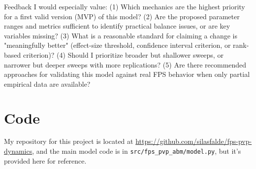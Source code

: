 \documentclass{assignment}
\begin{document}
Feedback I would especially value: (1) Which mechanics are the highest priority for a first valid version (MVP) of this model? (2) Are the proposed parameter ranges and metrics sufficient to identify practical balance issues, or are key variables missing? (3) What is a reasonable standard for claiming a change is "meaningfully better" (effect-size threshold, confidence interval criterion, or rank-based criterion)? (4) Should I prioritize broader but shallower sweeps, or narrower but deeper sweeps with more replications? (5) Are there recommended approaches for validating this model against real FPS behavior when only partial empirical data are available?

\section{Code}

My repository for this project is located at \url{https://github.com/silasfalde/fps-pvp-dynamics}, and the main model code is in \texttt{src/fps\_pvp\_abm/model.py}, but it's provided here for reference.

\lstset{
    language=Python,
    basicstyle=\ttfamily\small,
    breaklines=true,
    frame=single,
    numbers=left,
    numberstyle=\tiny,
    showstringspaces=false
}

\end{document}
